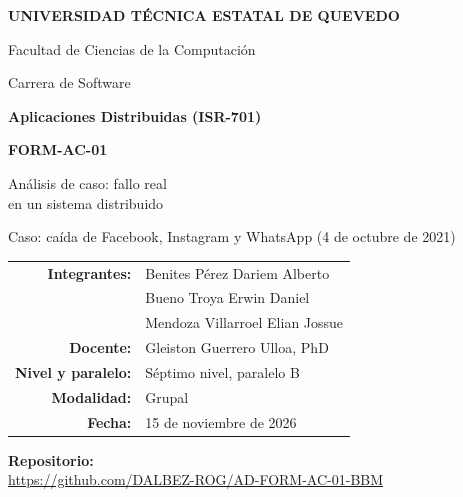 \documentclass[12pt,a4paper]{article}
\newcommand{\repourl}{https://github.com/DALBEZ-ROG/AD-FORM-AC-01-BBM}
\newcommand{\fecha}{15 de noviembre de 2026}
\begin{document}
\begin{center}
  {\Large\bfseries UNIVERSIDAD TÉCNICA ESTATAL DE QUEVEDO\par}
  \vspace{4pt}
  {\large Facultad de Ciencias de la Computación\par}
  {\large Carrera de Software\par}
  \vspace{1.6cm}
  {\large\bfseries Aplicaciones Distribuidas (ISR-701)\par}
  \vspace{0.8cm}
  {\Large\bfseries FORM-AC-01\par}
  \vspace{4pt}
  {\large Análisis de caso: fallo real\\ en un sistema distribuido\par}
  \vspace{4pt}
  {Caso: caída de Facebook, Instagram y WhatsApp (4 de octubre de 2021)\par}
\end{center}

\vspace{1.4cm}
\begin{center}
\renewcommand{\arraystretch}{1.5}
\begin{tabular}{>{\bfseries}r l}
  Integrantes: & Benites Pérez Dariem Alberto \\
               & Bueno Troya Erwin Daniel \\
               & Mendoza Villarroel Elian Jossue \\
  Docente:     & Gleiston Guerrero Ulloa, PhD \\
  Nivel y paralelo: & Séptimo nivel, paralelo B \\
  Modalidad:   & Grupal \\
  Fecha:       & \fecha \\
\end{tabular}
\end{center}

\vfill
\begin{center}
  {\bfseries Repositorio:}\\[4pt]
  {\small\url{\repourl}}
\end{center}
\vspace{1cm}
\end{document}
